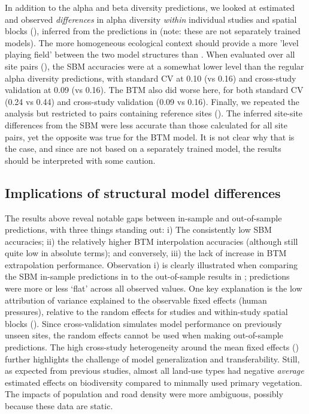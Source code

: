 In addition to the alpha and beta diversity predictions, we looked at estimated and observed \textit{differences} in alpha diversity \textit{within} individual studies and spatial blocks (), inferred from the predictions in  (note: these are not separately trained models). The more homogeneous ecological context should provide a more 'level playing field' between the two model structures than . When evaluated over all site pairs (), the SBM accuracies were at a somewhat lower level than the regular alpha diversity predictions, with standard CV at 0.10 (vs 0.16) and cross-study validation at 0.09 (vs 0.16). The BTM also did worse here, for both standard CV (0.24 vs 0.44) and cross-study validation (0.09 vs 0.16). Finally, we repeated the analysis but restricted to pairs containing reference sites (). The inferred site-site differences from the SBM were less accurate than those calculated for all site pairs, yet the opposite was true for the BTM model. It is not clear why that is the case, and since  are not based on a separately trained model, the results should be interpreted with some caution.

\vspace{\baselineskip}

\subsection*{Implications of structural model differences}

The results above reveal notable gaps between in-sample and out-of-sample predictions, with three things standing out: i) The consistently low SBM accuracies; ii) the relatively higher BTM interpolation accuracies (although still quite low in absolute terms); and conversely,  iii) the lack of increase in BTM extrapolation performance. Observation i) is clearly illustrated when comparing the SBM in-sample predictions in  to the out-of-sample results in ; predictions were more or less ‘flat’ across all observed values. One key explanation is the low attribution of variance explained\cite{nakagawa2013} to the observable fixed effects (human pressures), relative to the random effects for studies and within-study spatial blocks (). Since cross-validation simulates model performance on previously unseen sites, the random effects cannot be used when making out-of-sample predictions. The high cross-study heterogeneity around the mean fixed effects () further highlights the challenge of model generalization and transferability. Still, as expected from previous studies\cite{keck2025,jaureguiberry2022,newbold2015,depalma2021,bevan2024}, almost all land-use types had negative \textit{average} estimated effects on biodiversity compared to minmally used primary vegetation. The impacts of population and road density were more ambiguous, possibly because these data are static.


